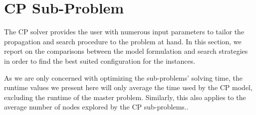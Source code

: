 
\section{CP Sub-Problem}
\label{sec:exp:cp}
The CP solver \chuffed provides the
user with numerous input parameters to
tailor the propagation and search procedure 
to the problem at hand.
In this section, we report on the comparisons
between the model formulation
and search strategies in order to find the best suited
configuration for the  instances.

As we are only concerned with optimizing the sub-problems'
solving time, the runtime values we present here will
only average the time used by the CP model, 
\ie excluding the runtime of the master problem.
Similarly, this also applies to the average number of nodes
explored by the CP sub-problems..



